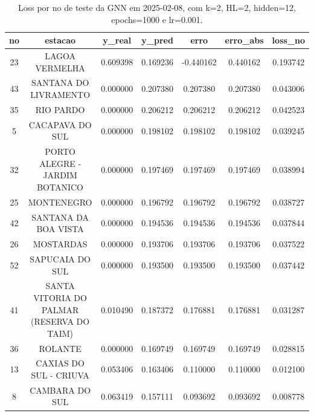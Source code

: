 \begin{table}[h]
\centering
\caption{Loss por no de teste da GNN em 2025-02-08, com k=2, HL=2, hidden=12, epochs=1000 e lr=0.001.}
\label{tab:gnn_loss_k2_hl2_h12_e1000_d20250208}
\begin{tabular}{ccccccc}
\toprule
no & estacao & y\_real & y\_pred & erro & erro\_abs & loss\_no \\
\midrule
23 & LAGOA VERMELHA & 0.609398 & 0.169236 & -0.440162 & 0.440162 & 0.193742 \\
43 & SANTANA DO LIVRAMENTO & 0.000000 & 0.207380 & 0.207380 & 0.207380 & 0.043006 \\
35 & RIO PARDO & 0.000000 & 0.206212 & 0.206212 & 0.206212 & 0.042523 \\
5 & CACAPAVA DO SUL & 0.000000 & 0.198102 & 0.198102 & 0.198102 & 0.039245 \\
32 & PORTO ALEGRE - JARDIM BOTANICO & 0.000000 & 0.197469 & 0.197469 & 0.197469 & 0.038994 \\
25 & MONTENEGRO & 0.000000 & 0.196792 & 0.196792 & 0.196792 & 0.038727 \\
42 & SANTANA DA BOA VISTA & 0.000000 & 0.194536 & 0.194536 & 0.194536 & 0.037844 \\
26 & MOSTARDAS & 0.000000 & 0.193706 & 0.193706 & 0.193706 & 0.037522 \\
52 & SAPUCAIA DO SUL & 0.000000 & 0.193500 & 0.193500 & 0.193500 & 0.037442 \\
41 & SANTA VITORIA DO PALMAR (RESERVA DO TAIM) & 0.010490 & 0.187372 & 0.176881 & 0.176881 & 0.031287 \\
36 & ROLANTE & 0.000000 & 0.169749 & 0.169749 & 0.169749 & 0.028815 \\
13 & CAXIAS DO SUL - CRIUVA & 0.053406 & 0.163406 & 0.110000 & 0.110000 & 0.012100 \\
8 & CAMBARA DO SUL & 0.063419 & 0.157111 & 0.093692 & 0.093692 & 0.008778 \\
\bottomrule
\end{tabular}
\end{table}
